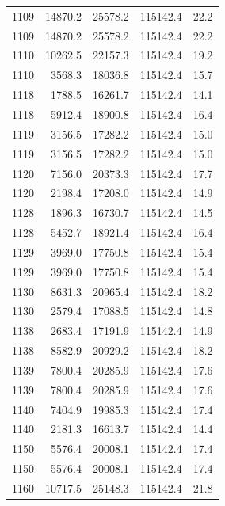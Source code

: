 \begin{longtable}{rrrrr}
    1109 & \num{14870.2} & \num{25578.2} & \num{115142.4} & 22.2 \\
    1109 & \num{14870.2} & \num{25578.2} & \num{115142.4} & 22.2 \\
    1110 & \num{10262.5} & \num{22157.3} & \num{115142.4} & 19.2 \\
    1110 & \num{3568.3} & \num{18036.8} & \num{115142.4} & 15.7 \\
    1118 & \num{1788.5} & \num{16261.7} & \num{115142.4} & 14.1 \\
    1118 & \num{5912.4} & \num{18900.8} & \num{115142.4} & 16.4 \\
    1119 & \num{3156.5} & \num{17282.2} & \num{115142.4} & 15.0 \\
    1119 & \num{3156.5} & \num{17282.2} & \num{115142.4} & 15.0 \\
    1120 & \num{7156.0} & \num{20373.3} & \num{115142.4} & 17.7 \\
    1120 & \num{2198.4} & \num{17208.0} & \num{115142.4} & 14.9 \\
    1128 & \num{1896.3} & \num{16730.7} & \num{115142.4} & 14.5 \\
    1128 & \num{5452.7} & \num{18921.4} & \num{115142.4} & 16.4 \\
    1129 & \num{3969.0} & \num{17750.8} & \num{115142.4} & 15.4 \\
    1129 & \num{3969.0} & \num{17750.8} & \num{115142.4} & 15.4 \\
    1130 & \num{8631.3} & \num{20965.4} & \num{115142.4} & 18.2 \\
    1130 & \num{2579.4} & \num{17088.5} & \num{115142.4} & 14.8 \\
    1138 & \num{2683.4} & \num{17191.9} & \num{115142.4} & 14.9 \\
    1138 & \num{8582.9} & \num{20929.2} & \num{115142.4} & 18.2 \\
    1139 & \num{7800.4} & \num{20285.9} & \num{115142.4} & 17.6 \\
    1139 & \num{7800.4} & \num{20285.9} & \num{115142.4} & 17.6 \\
    1140 & \num{7404.9} & \num{19985.3} & \num{115142.4} & 17.4 \\
    1140 & \num{2181.3} & \num{16613.7} & \num{115142.4} & 14.4 \\
    1150 & \num{5576.4} & \num{20008.1} & \num{115142.4} & 17.4 \\
    1150 & \num{5576.4} & \num{20008.1} & \num{115142.4} & 17.4 \\
    1160 & \num{10717.5} & \num{25148.3} & \num{115142.4} & 21.8 \\

\end{longtable}
